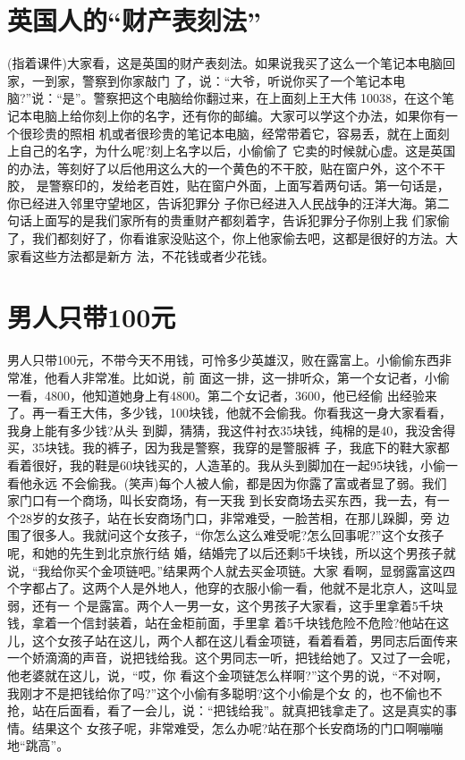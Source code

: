 \documentclass[11pt,a4paper,onecolumn]{article}
\begin{document}
\section{英国人的``财产表刻法''}

(指着课件)大家看，这是英国的财产表刻法。如果说我买了这么一个笔记本电脑回家，一到家，警察到你家敲门
了，说：``大爷，听说你买了一个笔记本电脑?''说：``是''。警察把这个电脑给你翻过来，在上面刻上王大伟
10038，在这个笔记本电脑上给你刻上你的名字，还有你的邮编。大家可以学这个办法，如果你有一个很珍贵的照相
机或者很珍贵的笔记本电脑，经常带着它，容易丢，就在上面刻上自己的名字，为什么呢?刻上名字以后，小偷偷了
它卖的时候就心虚。这是英国的办法，等刻好了以后他用这么大的一个黄色的不干胶，贴在窗户外，这个不干胶，
是警察印的，发给老百姓，贴在窗户外面，上面写着两句话。第一句话是，你已经进入邻里守望地区，告诉犯罪分
子你已经进入人民战争的汪洋大海。第二句话上面写的是我们家所有的贵重财产都刻着字，告诉犯罪分子你别上我
们家偷了，我们都刻好了，你看谁家没贴这个，你上他家偷去吧，这都是很好的方法。大家看这些方法都是新方
法，不花钱或者少花钱。


\section{男人只带100元}

男人只带100元，不带今天不用钱，可怜多少英雄汉，败在露富上。小偷偷东西非常准，他看人非常准。比如说，前
面这一排，这一排听众，第一个女记者，小偷一看，4800，他知道她身上有4800。第二个女记者，3600，他已经偷
出经验来了。再一看王大伟，多少钱，100块钱，他就不会偷我。你看我这一身大家看看，我身上能有多少钱?从头
到脚，猜猜，我这件衬衣35块钱，纯棉的是40，我没舍得买，35块钱。我的裤子，因为我是警察，我穿的是警服裤
子，我底下的鞋大家都看着很好，我的鞋是60块钱买的，人造革的。我从头到脚加在一起95块钱，小偷一看他永远
不会偷我。(笑声)每个人被人偷，都是因为你露了富或者显了弱。我们家门口有一个商场，叫长安商场，有一天我
到长安商场去买东西，我一去，有一个28岁的女孩子，站在长安商场门口，非常难受，一脸苦相，在那儿跺脚，旁
边围了很多人。我就问这个女孩子，``你怎么这么难受呢?怎么回事呢?''这个女孩子呢，和她的先生到北京旅行结
婚，结婚完了以后还剩5千块钱，所以这个男孩子就说，``我给你买个金项链吧。''结果两个人就去买金项链。大家
看啊，显弱露富这四个字都占了。这两个人是外地人，他穿的衣服小偷一看，他就不是北京人，这叫显弱，还有一
个是露富。两个人一男一女，这个男孩子大家看，这手里拿着5千块钱，拿着一个信封装着，站在金柜前面，手里拿
着5千块钱危险不危险?他站在这儿，这个女孩子站在这儿，两个人都在这儿看金项链，看着看着，男同志后面传来
一个娇滴滴的声音，说把钱给我。这个男同志一听，把钱给她了。又过了一会呢，他老婆就在这儿，说，``哎，你
看这个金项链怎么样啊?''这个男的说，``不对啊，我刚才不是把钱给你了吗?''这个小偷有多聪明?这个小偷是个女
的，也不偷也不抢，站在后面看，看了一会儿，说：``把钱给我''。就真把钱拿走了。这是真实的事情。结果这个
女孩子呢，非常难受，怎么办呢?站在那个长安商场的门口啊嘣嘣地``跳高''。
\end{document}

